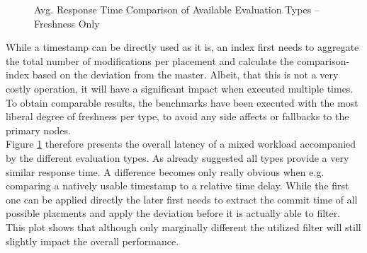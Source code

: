 \begin{figure}[t] 
    \centering 
    \caption{Avg. Response Time Comparison of Available Evaluation Types -- Freshness Only}
    \label{fig:eval_type}
\end{figure}

While a timestamp can be directly used as it is, an index first needs to aggregate the total number of modifications per placement and 
calculate the comparison-index based on the deviation from the master.
Albeit, that this is not a very costly operation, it will have a significant impact when executed multiple times.
To obtain comparable results, the benchmarks have been executed with the most liberal degree of freshness per type, to avoid any side affects or fallbacks to the primary nodes.\\
Figure \ref{fig:eval_type} therefore presents the overall latency of a mixed workload accompanied by the different evaluation types.
As already suggested all types provide a very similar response time. A difference becomes only really obvious when e.g. comparing a natively usable
timestamp to a relative time delay. While the first one can be applied directly the later first
needs to extract the commit time of all possible placments and apply the deviation before it is actually able to filter.
This plot shows that although only marginally different the utilized filter will still slightly impact the overall performance.




